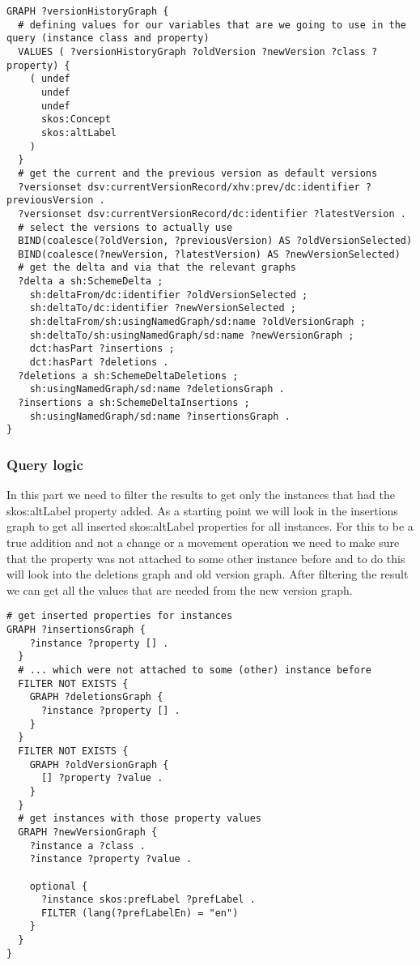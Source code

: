 \begin{lstlisting}
GRAPH ?versionHistoryGraph {
  # defining values for our variables that are we going to use in the query (instance class and property)
  VALUES ( ?versionHistoryGraph ?oldVersion ?newVersion ?class ?property) {
    ( undef
      undef
      undef
      skos:Concept 
      skos:altLabel 
    )
  }
  # get the current and the previous version as default versions
  ?versionset dsv:currentVersionRecord/xhv:prev/dc:identifier ?previousVersion .
  ?versionset dsv:currentVersionRecord/dc:identifier ?latestVersion .
  # select the versions to actually use
  BIND(coalesce(?oldVersion, ?previousVersion) AS ?oldVersionSelected)
  BIND(coalesce(?newVersion, ?latestVersion) AS ?newVersionSelected)
  # get the delta and via that the relevant graphs
  ?delta a sh:SchemeDelta ;
    sh:deltaFrom/dc:identifier ?oldVersionSelected ;
    sh:deltaTo/dc:identifier ?newVersionSelected ;
    sh:deltaFrom/sh:usingNamedGraph/sd:name ?oldVersionGraph ;
    sh:deltaTo/sh:usingNamedGraph/sd:name ?newVersionGraph ;
    dct:hasPart ?insertions ;
    dct:hasPart ?deletions .
  ?deletions a sh:SchemeDeltaDeletions ;
    sh:usingNamedGraph/sd:name ?deletionsGraph .
  ?insertions a sh:SchemeDeltaInsertions ;
    sh:usingNamedGraph/sd:name ?insertionsGraph .
}
\end{lstlisting}

\subsubsection{Query logic}
In this part we need to filter the results to get only the instances that had the skos:altLabel property added. As a starting point we will look in the insertions graph to get all inserted skos:altLabel properties for all instances. For this to be a true addition and not a change or a movement operation we need to make sure that the property was not attached to some other instance before and to do this will look into the deletions graph and old version graph. After filtering the result we can get all the values that are needed from the new version graph.

\begin{lstlisting}
# get inserted properties for instances
GRAPH ?insertionsGraph {
    ?instance ?property [] .
  }
  # ... which were not attached to some (other) instance before
  FILTER NOT EXISTS {
    GRAPH ?deletionsGraph {
      ?instance ?property [] .
    }
  }
  FILTER NOT EXISTS {
    GRAPH ?oldVersionGraph {
      [] ?property ?value .
    }
  }
  # get instances with those property values
  GRAPH ?newVersionGraph {
    ?instance a ?class .
    ?instance ?property ?value .

    optional {
      ?instance skos:prefLabel ?prefLabel .
      FILTER (lang(?prefLabelEn) = "en")
    }
  }
}
\end{lstlisting}
